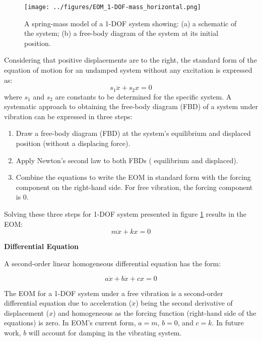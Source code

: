 \documentclass[12pt,letter]{article}
\begin{document}
		\begin{figure}[H]
			\centering
			\texttt{[image: ../figures/EOM\_1-DOF-mass\_horizontal.png]}
			\caption{A spring-mass model of a 1-DOF system showing: (a) a schematic of the system; (b) a free-body diagram of the system at its initial position.}
			\label{fig:EOM_1-DOF-mass_horizontal}
		\end{figure}			
		
		\pagebreak
		Considering that positive displacements are to the right, the standard form of the equation of motion for an undamped system without any excitation is expressed as:  
		\begin{equation}
			s_1 \ddot{x} + s_2 x = 0
		\end{equation}			
		where $s_1$ and $s_2$ are constants to be determined for the specific system. A systematic approach to obtaining the free-body diagram (FBD) of a system under vibration can be expressed in three steps:
		\begin{enumerate}
			\item Draw a free-body diagram (FBD) at the system's equilibrium and displaced position (without a displacing force).
			\item Apply Newton's second law to both FBDs ( equilibrium and displaced).
			\item Combine the equations to write the EOM in standard form with the forcing component on the right-hand side. For free vibration, the forcing component is 0. 
		\end{enumerate}
			
		Solving these three steps for 1-DOF system presented in figure \ref{fig:EOM_1-DOF-mass_horizontal} results in the EOM:
		\begin{equation}
			m \ddot{x} + k x = 0
		\end{equation}

		\begin{review}

			\textbf{Differential Equation}

			\noindent A second-order linear homogeneous differential equation has the form:
			
			\begin{equation}
			 a \ddot{x} + b \dot{x} + cx = 0
			\end{equation}
		
			\noindent The EOM for a 1-DOF system under a free vibration is a second-order differential equation due to acceleration ($\ddot{x}$) being the second derivative of displacement ($x$) and homogeneous as the forcing function (right-hand side of the equations) is zero. In EOM's current form, $a=m$, $b=0$,  and $c=k$. In future work, $b$ will account for damping in the vibrating system.     
		\end{review}
\end{document}
